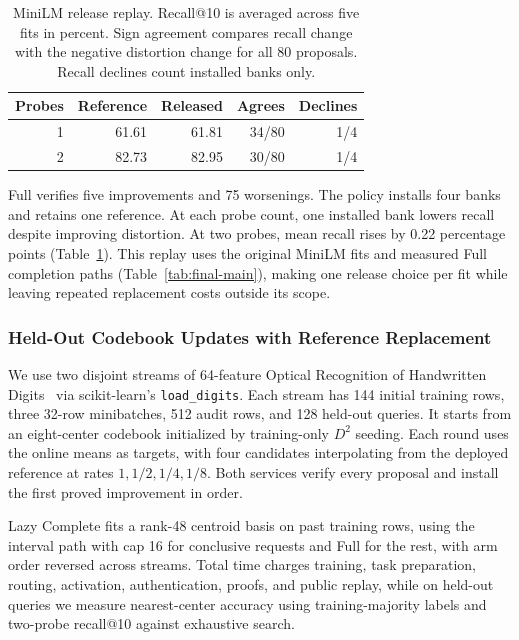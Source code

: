 \documentclass[5p,times,twocolumn]{elsarticle}
\begin{document}
\begin{table}[tbp]
\centering\small
\caption{MiniLM release replay. Recall@10 is averaged across five fits
in percent. Sign agreement compares recall change with the negative
distortion change for all 80 proposals. Recall declines count installed
banks only.}
\label{tab:ivf-release}
\begin{tabular}{@{}rrrrr@{}}\toprule
Probes & Reference & Released & Agrees & Declines\\\midrule
1 & 61.61 & 61.81 & 34/80 & 1/4\\
2 & 82.73 & 82.95 & 30/80 & 1/4\\
\bottomrule\end{tabular}
\end{table}

Full verifies five improvements and 75 worsenings. The policy installs four banks and retains one reference. At each probe count, one installed bank lowers recall despite improving distortion. At two probes, mean recall rises by 0.22 percentage points (Table~\ref{tab:ivf-release}). This replay uses the original MiniLM fits and measured Full completion paths (Table~\ref{tab:final-main}), making one release choice per fit while leaving repeated replacement costs outside its scope.

\subsubsection{Held-Out Codebook Updates with Reference Replacement}
\label{sec:digits-lifecycle}
We use two disjoint streams of 64-feature Optical Recognition of Handwritten Digits~\cite{optdigits1998} via scikit-learn's \texttt{load\_digits}. Each stream has 144 initial training rows, three 32-row minibatches, 512 audit rows, and 128 held-out queries. It starts from an eight-center codebook initialized by training-only $D^2$ seeding. Each round uses the online means as targets, with four candidates interpolating from the deployed reference at rates $1,1/2,1/4,1/8$. Both services verify every proposal and install the first proved improvement in order.

Lazy Complete fits a rank-48 centroid basis on past training rows, using the interval path with cap 16 for conclusive requests and Full for the rest, with arm order reversed across streams. Total time charges training, task preparation, routing, activation, authentication, proofs, and public replay, while on held-out queries we measure nearest-center accuracy using training-majority labels and two-probe recall@10 against exhaustive search.
\end{document}
